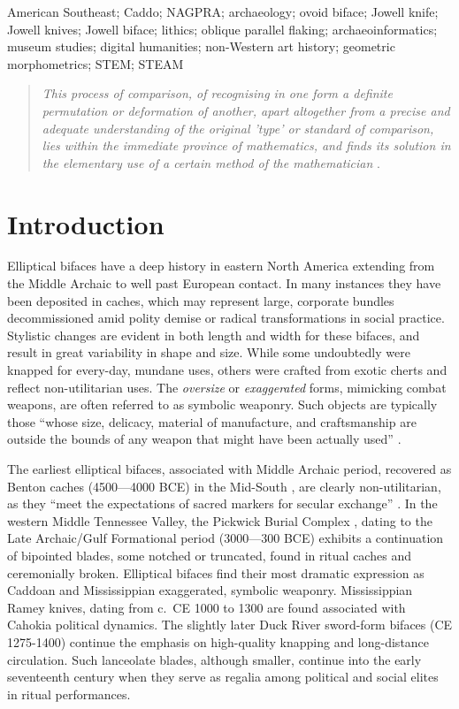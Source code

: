 \documentclass[]{interact}
\theoremstyle{plain}%
\theoremstyle{definition}
\theoremstyle{remark}
\begin{document}
\begin{keywords}
American Southeast; Caddo; NAGPRA; archaeology; ovoid biface; Jowell
knife; Jowell knives; Jowell biface; lithics; oblique parallel flaking;
archaeoinformatics; museum studies; digital humanities; non-Western art
history; geometric morphometrics; STEM; STEAM
\end{keywords}

\begin{quote}
\textit{This process of comparison, of recognising in one form a definite permutation or deformation of another, apart altogether from a precise and adequate understanding of the original 'type' or standard of comparison, lies within the immediate province of mathematics, and finds its solution in the elementary use of a certain method of the mathematician} \citep{RN7522}.
\end{quote}

\hypertarget{introduction}{%
\section{Introduction}\label{introduction}}

Elliptical bifaces have a deep history in eastern North America
extending from the Middle Archaic to well past European contact. In many
instances they have been deposited in caches, which may represent large,
corporate bundles decommissioned amid polity demise or radical
transformations in social practice. Stylistic changes are evident in
both length and width for these bifaces, and result in great variability
in shape and size. While some undoubtedly were knapped for every-day,
mundane uses, others were crafted from exotic cherts and reflect
non-utilitarian uses. The \emph{oversize} or \emph{exaggerated} forms,
mimicking combat weapons, are often referred to as symbolic weaponry.
Such objects are typically those ``whose size, delicacy, material of
manufacture, and craftsmanship are outside the bounds of any weapon that
might have been actually used'' \citep[624]{RN11177}.

The earliest elliptical bifaces, associated with Middle Archaic period,
recovered as Benton caches (4500---4000 BCE) in the Mid-South
\citep{RN11179}, are clearly non-utilitarian, as they ``meet the
expectations of sacred markers for secular exchange''
\citep[143]{RN11178}. In the western Middle Tennessee Valley, the
Pickwick Burial Complex \citep[94]{RN11180}, dating to the Late
Archaic/Gulf Formational period (3000---300 BCE) exhibits a continuation
of bipointed blades, some notched or truncated, found in ritual caches
and ceremonially broken. Elliptical bifaces find their most dramatic
expression as Caddoan and Mississippian exaggerated, symbolic weaponry.
Mississippian Ramey knives, dating from c.~CE 1000 to 1300 are found
associated with Cahokia political dynamics. The slightly later Duck
River sword-form bifaces (CE 1275-1400) continue the emphasis on
high-quality knapping and long-distance circulation. Such lanceolate
blades, although smaller, continue into the early seventeenth century
when they serve as regalia among political and social elites in ritual
performances.
\end{document}
